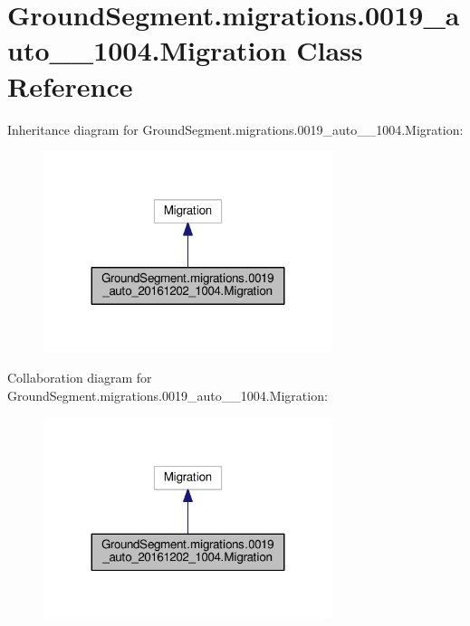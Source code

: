 \hypertarget{class_ground_segment_1_1migrations_1_10019__auto__20161202__1004_1_1_migration}{}\section{Ground\+Segment.\+migrations.0019\+\_\+auto\+\_\+\_\+1004.Migration Class Reference}
\label{class_ground_segment_1_1migrations_1_10019__auto__20161202__1004_1_1_migration}


Inheritance diagram for Ground\+Segment.\+migrations.0019\+\_\+auto\+\_\+\_\+1004.Migration\+:\nopagebreak
\begin{figure}[H]
\begin{center}
\leavevmode
\includegraphics[width=239pt]{class_ground_segment_1_1migrations_1_10019__auto__20161202__1004_1_1_migration__inherit__graph}
\end{center}
\end{figure}


Collaboration diagram for Ground\+Segment.\+migrations.0019\+\_\+auto\+\_\+\_\+1004.Migration\+:\nopagebreak
\begin{figure}[H]
\begin{center}
\leavevmode
\includegraphics[width=239pt]{class_ground_segment_1_1migrations_1_10019__auto__20161202__1004_1_1_migration__coll__graph}
\end{center}
\end{figure}
